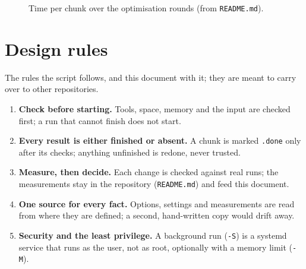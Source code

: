 \documentclass[11pt,a4paper]{article}
\begin{document}
\begin{figure}[ht]
\centering
{}\statetable
\pgfplotstablegetrowsof{\statetable}
\caption{Time per chunk over the optimisation rounds (from \texttt{README.md}).}
\label{fig:state}
\end{figure}

\section{Design rules}\label{sec:rules}

The rules the script follows, and this document with it; they are meant to carry over to other
repositories.
\begin{enumerate}
  \item \textbf{Check before starting.} Tools, space, memory and the input are checked first; a run
    that cannot finish does not start.
  \item \textbf{Every result is either finished or absent.} A chunk is marked \texttt{.done} only after
    its checks; anything unfinished is redone, never trusted.
  \item \textbf{Measure, then decide.} Each change is checked against real runs; the measurements
    stay in the repository (\texttt{README.md}) and feed this document.
  \item \textbf{One source for every fact.} Options, settings and measurements are read from where
    they are defined; a second, hand-written copy would drift away.
  \item \textbf{Security and the least privilege.} A background run (\texttt{-S}) is a systemd
    service that runs as the user, not as root, optionally with a memory limit (\texttt{-M}).
\end{enumerate}
\end{document}
